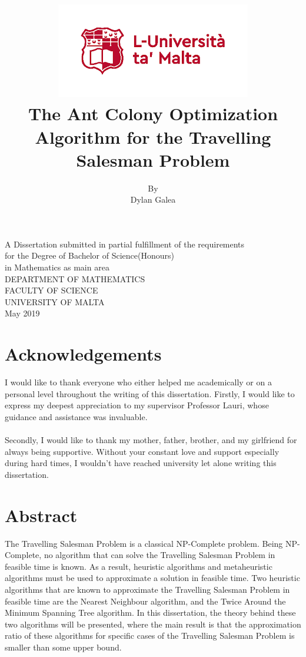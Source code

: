 \documentclass[12pt]{article}
\title{\includegraphics[scale=0.6]{screenshots/crest.png}\\[1cm]
The Ant Colony Optimization Algorithm for the Travelling Salesman Problem\vspace{-2ex}
}
\date{}
\author{By\\Dylan Galea\\[1cm]}
\numberwithin{equation}{subsection}
\numberwithin{table}{subsection}
\numberwithin{algorithm}{subsection}
\numberwithin{figure}{subsection}
\begin{document}
\clearpage\maketitle
\thispagestyle{empty}
{\centering A Dissertation submitted in partial fulfillment of the requirements\\
for the Degree of Bachelor of Science(Honours)\\ in Mathematics as main area\\[2cm]}
{\centering DEPARTMENT OF MATHEMATICS\\
FACULTY OF SCIENCE\\ UNIVERSITY OF MALTA\\[2cm]}
{\centering May 2019\\}
\newpage
{\center\section*{Acknowledgements}}
\noindent
I would like to thank everyone who either helped me academically or on a personal level throughout the writing of this dissertation. Firstly, I would like to express my deepest appreciation to my supervisor Professor Lauri, whose guidance and assistance was invaluable.\\\\
Secondly, I would like to thank my mother, father, brother, and my girlfriend for always being supportive. Without your constant love and support especially during hard times, I wouldn't have reached university let alone writing this dissertation.
\newpage
{\center\section*{Abstract}}
\noindent
The Travelling Salesman Problem is a classical NP-Complete problem. Being NP-Complete, no algorithm that can solve the Travelling Salesman Problem in feasible time is known. As a result, heuristic algorithms and metaheuristic algorithms must be used to approximate a solution in feasible time. Two heuristic algorithms that are known to approximate the Travelling Salesman Problem in feasible time are the Nearest Neighbour algorithm, and the Twice Around the Minimum Spanning Tree algorithm. In this dissertation, the theory behind these two algorithms will be presented, where the main result is that the approximation ratio of these algorithms for specific cases of the Travelling Salesman Problem is smaller than some upper bound. \\\\
\end{document}

